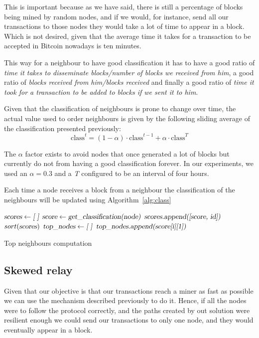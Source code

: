 \documentclass{dads}   %
\begin{document}
This is important because as we have said, there is still a percentage of blocks being mined by random nodes, and if we would, for instance, send all our transactions to those nodes they would take a lot of time to appear in a block. Which is not desired, given that the average time it takes for a transaction to be accepted in Bitcoin nowadays is ten minutes.

This way for a neighbour to have good classification it has to have a good ratio of \textsl{time it takes to disseminate blocks/number of blocks we received from him}, a good ratio of \textsl{blocks received from him/blocks received} and finally a good ratio of \textsl{time it took for a transaction to be added to blocks if we sent it to him}.

Given that the classification of neighbours is prone to change over time, the actual value used to order neighbours is given by the following sliding average of the classification presented previously:
\begin{displaymath} \mbox{class}^t = (1-\alpha) \cdot \mbox{class}^{t-1} + \alpha \cdot \mbox{class}^{T} \end{displaymath}

The $\alpha$ factor exists to avoid nodes that once generated a lot of blocks but currently do not from having a good classification forever. In our experiments, we used an $\alpha=0.3$ and a \textit{T} configured to be an interval of four hours.

Each time a node receives a block from a neighbour the classification of the neighbours will be updated using Algorithm~\ref{alg:class}

\begin{algorithm}[t]
\begin{algorithmic}[1]
\State $\textsl{scores} \gets \textsl{[ ]}$
  \State $\textsl{score} \gets \textsl{get\_classification(node)}$
  \State $\textsl{scores.append([score, id])}$
\EndFor
\State $sort(\textsl{scores})$
\State $\textsl{top\_nodes} \gets \textsl{[ ]}$
  \State $\textsl{top\_nodes.append(score[i][1])}$
\EndFor
\EndFunction
\end{algorithmic}
\caption{Top neighbours computation}
\label{alg:class}
\end{algorithm}
\subsection{Skewed relay}
\label{sec:sr}
Given that our objective is that our transactions reach a miner as fast as possible we can use the mechanism described previously to do it. Hence, if all the nodes were to follow the protocol correctly, and the paths created by out solution were resilient enough we could send our transactions to only one node, and they would eventually appear in a block.
\end{document}

